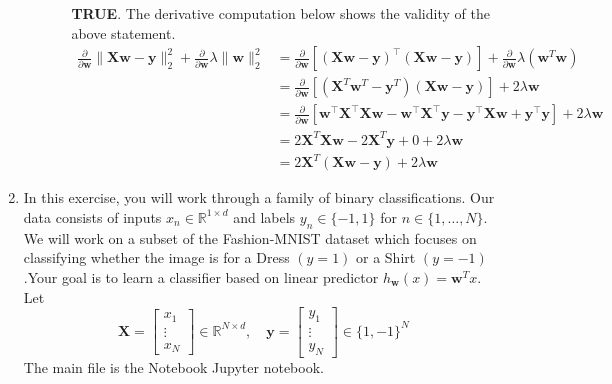 \documentclass[letterpaper]{article}
\theoremstyle{definition}
\begin{document}
\begin{enumerate}
\begin{enumerate}
\begin{enumerate}
\color{teal}
\textbf{TRUE}. The derivative computation below shows the validity of the above statement.
\begin{align*}
\frac{\partial}{\partial \mathbf{w}} \|\boldsymbol{X} \mathbf{w}-\mathbf{y}\|_{2}^{2}+ \frac{\partial}{\partial \mathbf{w}} \lambda\|\mathbf{w}\|_{2}^{2}
&= \frac{\partial}{\partial \mathbf{w}} \left[(\boldsymbol{X}\mathbf{w} - \mathbf{y})^{\top}(\boldsymbol{X}\mathbf{w} - \mathbf{y})\right] +
\frac{\partial}{\partial \mathbf{w}} \lambda (\mathbf{w}^T\mathbf{w}) \\
&= \frac{\partial}{\partial \mathbf{w}} \left[(\mathbf{X}^T\mathbf{w}^T - \mathbf{y}^T)(\mathbf{Xw} - \mathbf{y})\right]  + 2\lambda\mathbf{w} \\
&= \frac{\partial}{\partial \mathbf{w}} \left[\mathbf{w}^\top \boldsymbol{X}^\top \boldsymbol{X} \mathbf{w} - \mathbf{w}^\top \boldsymbol{X}^\top \mathbf{y} - \mathbf{y}^\top \boldsymbol{X} \mathbf{w} + \mathbf{y}^\top \mathbf{y}\right] + 2\lambda\mathbf{w}\\
&= 2\mathbf{X}^T\mathbf{Xw} - 2\mathbf{X}^T\mathbf{y} + 0 + 2\lambda\mathbf{w} \\
&= 2\mathbf{X}^T(\mathbf{Xw} - \mathbf{y}) + 2\lambda\mathbf{w}
\end{align*}

\color{black}
\end{enumerate}
\end{enumerate}

\item In this exercise, you will work through a family of binary classifications.
Our data consists of inputs \(x_{n} \in \mathbb{R}^{1 \times d}\) and labels \(y_{n} \in\{-1,1\}\)
for \(n \in\{1, \ldots, N\}\). We will work on a subset of the Fashion-MNIST dataset which focuses
on classifying whether the image is for a Dress \((y=1)\) or a Shirt \((y=-1)\).Your goal is to
learn a classifier based on linear predictor \(h_{\mathbf{w}}(x)=\mathbf{w}^{T} x\). Let
\begin{equation}
\mathbf{X}=\left[\begin{array}{c}
x_{1}  \tag{4}\\
\vdots \\
x_{N}
\end{array}\right] \in \mathbb{R}^{N \times d}, \quad \mathbf{y}=\left[\begin{array}{c}
y_{1} \\
\vdots \\
y_{N}
\end{array}\right] \in\{1,-1\}^{N}
\end{equation}
The main file is the Notebook Jupyter notebook.


\end{enumerate}
\end{document}
